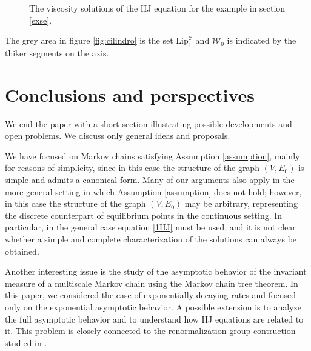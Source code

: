 \documentclass[reqno]{amsart}
\theoremstyle{plain}
\theoremstyle{definition}
\theoremstyle{remark}
\numberwithin{equation}{section}
\numberwithin{theorem}{section}
\newcommand{\<}{\langle}
\renewcommand{\>}{\rangle}
\begin{document}
\begin{figure}
\caption{The viscosity solutions of the HJ equation for the example in section \ref{exse}.}
\end{figure}

The grey area in figure \ref{fig:cilindro} is the set $\mathrm{Lip}_1^{\mathcal C}$ and $\mathcal{W}_0$ is indicated by the thiker segments on the axis. 


\section{Conclusions and perspectives}
We end the paper with a short section illustrating possible developments and open problems. We discuss only general ideas and proposals.

\smallskip

We have focused on Markov chains satisfying Assumption \ref{assumption}, mainly for reasons of simplicity, since in this case the structure of the graph $(V,E_0)$ is simple and admits a canonical form. Many of our arguments also apply in the more general setting in which Assumption \ref{assumption} does not hold; however, in this case the structure of the graph $(V,E_0)$ may be arbitrary, representing the discrete counterpart of equilibrium points in the continuous setting. In particular, in the general case equation \eqref{1HJ} must be used, and it is not clear whether a simple and complete characterization of the solutions can always be obtained. 

\smallskip

Another interesting issue is the study of the asymptotic behavior of the invariant measure of a multiscale Markov chain using the Markov chain tree theorem. In this paper, we considered the case of exponentially decaying rates and focused only on the exponential asymptotic behavior. A possible extension is to analyze the full asymptotic behavior and to understand how HJ equations are related to it. This problem is closely connected to the renormalization group contruction studied in \cite{OS1, OS2, S1, S2, S3}.
\end{document}
